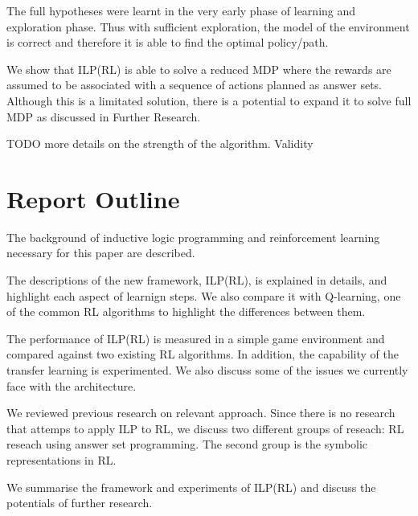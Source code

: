The full hypotheses were learnt in the very early phase of learning and exploration phase. Thus with sufficient exploration, the model of the environment is correct
and therefore it is able to find the optimal policy/path. 

We show that ILP(RL) is able to solve a reduced MDP where the rewards are assumed to be associated with a sequence of actions planned as answer sets.
Although this is a limitated solution, there is a potential to expand it to solve full MDP as discussed in Further Research. 

TODO more details on the strength of the algorithm. 
Validity


\section{Report Outline}
\begin{customthm}{2}
The background of inductive logic programming and reinforcement learning necessary for this paper are described.
\end{customthm}

\begin{customthm}{3}
The descriptions of the new framework, ILP(RL), is explained in details, and highlight each aspect of learnign steps. We also compare it with Q-learning, one of the common RL algorithms to highlight the differences between them. 
\end{customthm}

\begin{customthm}{4}
The performance of ILP(RL) is measured in a simple game environment and compared against two existing RL algorithms. In addition, the capability of the transfer learning is experimented.
We also discuss some of the issues we currently face with the architecture.
\end{customthm}

\begin{customthm}{5}
We reviewed previous research on relevant approach. Since there is no research that attemps to apply ILP to RL, we discuss two different groups of reseach: 
RL reseach using answer set programming. The second group is the symbolic representations in RL.  
\end{customthm}

\begin{customthm}{6}
We summarise the framework and experiments of ILP(RL) and discuss the potentials of further research. 
\end{customthm}